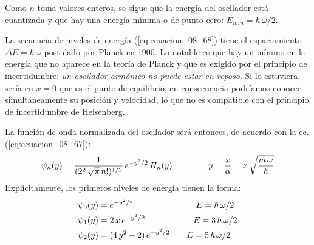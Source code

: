 Como $n$ toma valores enteros, se sigue que la energía del oscilador está cuantizada y que hay una energía mínima o de punto cero: $E_{min} = \hbar \, \omega /2$.
\par
La secuencia de niveles de energía (\ref{eq:ecuacion_08_68}) tiene el espaciamiento $\Delta E = \hbar \, \omega$ postulado por Planck en 1900. Lo notable es que hay un mínimo en la energía que no aparece en la teoría de Planck y que es exigido por el principio de incertidumbre: \emph{un oscilador armónico no puede estar en reposo}. Si lo estuviera, sería en $x = 0$ que es el punto de equilibrio; en consecuencia podríamos conocer simultáneamente su posición y velocidad, lo que no es compatible con el principio de incertidumbre de Heisenberg.
\par
La función de onda normalizada del oscilador será entonces, de acuerdo con la ec. (\ref{eq:ecuacion_08_67}):
\begin{align}
\psi_{n} (y) = \dfrac{1}{(2^{2} \, \sqrt{\pi} \, n!)^{1/2}} \, e^{-y^{2}/2} \, H_{n} (y) \hspace{1.5cm} y = \dfrac{x}{\alpha} = x \, \sqrt{\dfrac{m \, \omega}{\hbar}}
\label{eq:ecuacion_08_69}
\end{align}
Explícitamente, los primeros niveles de energía tienen la forma:
\begin{align*}
\psi_{0} (y) &= e^{-y^{2}/2} \hspace{2.6cm} E = \hbar \, \omega /2 \\
\psi_{1} (y) &= 2 \, x \, e^{-y^{2}/2} \hspace{2cm} E = 3 \, \hbar \, \omega /2 \\
\psi_{2} (y) &= (4 \, y^{2} - 2) \, e^{-y^{2}/2} \hspace{0.7cm} E = 5 \, \hbar \, \omega /2 \\
\end{align*}
